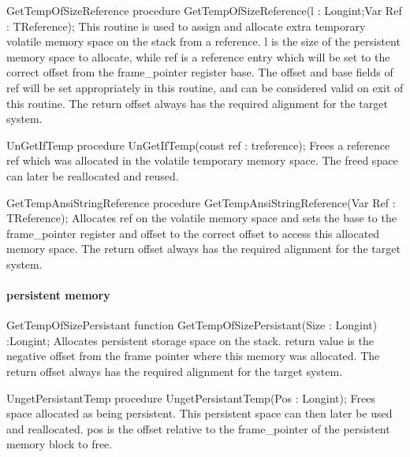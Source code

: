 \documentclass [12pt]{article}
\begin{document}
\begin{procedure}{GetTempOfSizeReference}
\Declaration
procedure GetTempOfSizeReference(l : Longint;Var Ref : TReference);
\Description 
This routine is used to assign and allocate extra temporary volatile memory
space on the stack from a reference. \textsf{l} is the size of the
persistent memory space to allocate, while \textsf{ref} is a reference entry
which will be set to the correct offset from the frame{\_}pointer register
base. The \textsf{offset} and \textsf{base} fields of \textsf{ref} will be
set appropriately in this routine, and can be considered valid on exit of
this routine. 
\Notes 
The return offset always has the required alignment for the target system.
\end{procedure}

\begin{procedure}{UnGetIfTemp}
\Declaration
procedure UnGetIfTemp(const ref : treference);
\Description 
Frees a reference \textsf{ref} which was allocated in the volatile temporary
memory space.  
\Notes 
The freed space can later be reallocated and reused. 
\end{procedure}

\begin{procedure}{GetTempAnsiStringReference}
\Declaration
procedure GetTempAnsiStringReference(Var Ref : TReference);
\Description 
Allocates \textsf{ref }on the volatile memory space and sets the
\textsf{base} to the frame{\_}pointer register and \textsf{offset} to the
correct offset to access this allocated memory space. 
\Notes 
The return offset always has the required alignment for the target system.
\end{procedure}

\paragraph{persistent memory}

\begin{function}{GetTempOfSizePersistant}
\Declaration
function GetTempOfSizePersistant(Size : Longint) :Longint;
\Description 
Allocates persistent storage space on the stack. return value is the
negative offset from the frame pointer where this memory was allocated. 
\Notes 
The return offset always has the required alignment for the target system.
\end{function}

\begin{function}{UngetPersistantTemp}
\Declaration
procedure UngetPersistantTemp(Pos : Longint);
\Description 
Frees space allocated as being persistent. This persistent space can then
later be used and reallocated. \textsf{pos} is the offset relative to the
frame{\_}pointer of the persistent memory block to free. 
\end{function}
\end{document}
